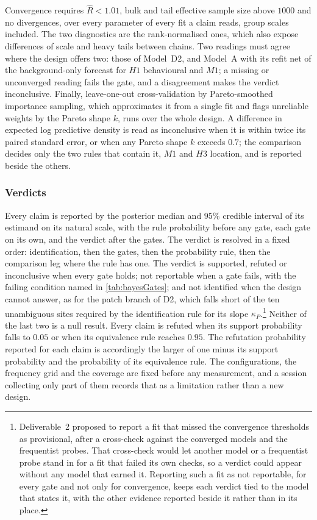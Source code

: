 Convergence requires $\hat R<1.01$, bulk and tail effective sample size above $1000$ and no divergences, over every parameter of every fit a claim reads, group scales included. The two diagnostics are the rank-normalised ones, which also expose differences of scale and heavy tails between chains\autocite{vehtariRankNormalizationFoldingLocalization2021}. Two readings must agree where the design offers two: those of Model~D2, and Model~A with its refit net of the background-only forecast for $H1$ behavioural and $M1$; a missing or unconverged reading fails the gate, and a disagreement makes the verdict inconclusive. Finally, leave-one-out cross-validation by Pareto-smoothed importance sampling\autocite{vehtariPracticalBayesianModel2017}, which approximates it from a single fit and flags unreliable weights by the Pareto shape $k$, runs over the whole design. A difference in expected log predictive density is read as inconclusive when it is within twice its paired standard error, or when any Pareto shape $k$ exceeds $0.7$; the comparison decides only the two rules that contain it, $M1$ and $H3$ location, and is reported beside the others.

\subsubsection{Verdicts}

Every claim is reported by the posterior median and $95\%$ credible interval of its estimand on its natural scale, with the rule probability before any gate, each gate on its own, and the verdict after the gates. The verdict is resolved in a fixed order: identification, then the gates, then the probability rule, then the comparison leg where the rule has one. The verdict is supported, refuted or inconclusive when every gate holds; not reportable when a gate fails, with the failing condition named in \autoref{tab:bayesGates}; and not identified when the design cannot answer, as for the patch branch of D2, which falls short of the ten unambiguous sites required by the identification rule for its slope $\kappa_P$.\footnote{Deliverable~2 proposed to report a fit that missed the convergence thresholds as provisional, after a cross-check against the converged models and the frequentist probes. That cross-check would let another model or a frequentist probe stand in for a fit that failed its own checks, so a verdict could appear without any model that earned it. Reporting such a fit as not reportable, for every gate and not only for convergence, keeps each verdict tied to the model that states it, with the other evidence reported beside it rather than in its place.} Neither of the last two is a null result. Every claim is refuted when its support probability falls to $0.05$ or when its equivalence rule reaches $0.95$. The refutation probability reported for each claim is accordingly the larger of one minus its support probability and the probability of its equivalence rule. The configurations, the frequency grid and the coverage are fixed before any measurement, and a session collecting only part of them records that as a limitation rather than a new design.

